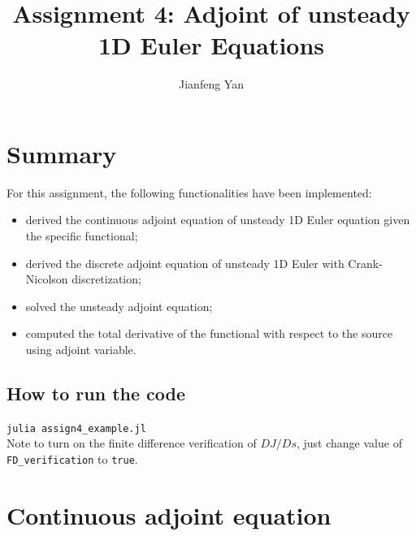 \documentclass[a4paper]{article}
\title{Assignment 4: Adjoint of unsteady 1D Euler Equations}
\author{Jianfeng Yan}
\begin{document}
 \maketitle
 
\begin{abstract}
  
\end{abstract}

\section{Summary}
For this assignment, the following functionalities have been implemented:
\begin{itemize}
  \item derived the continuous adjoint equation of unsteady 1D Euler equation given the specific functional;
  \item derived the discrete adjoint equation of unsteady 1D Euler with Crank-Nicolson discretization;
  \item solved the unsteady adjoint equation;
  \item computed the total derivative of the functional with respect to the source using adjoint variable.
\end{itemize}
\subsection{How to run the code}
\hspace{1cm}\texttt{julia assign4\_example.jl}\\
Note to turn on the finite difference verification of $DJ/Ds$, just change value of \texttt{FD\_verification} to \texttt{true}.
\section{Continuous adjoint equation}
\end{document}
